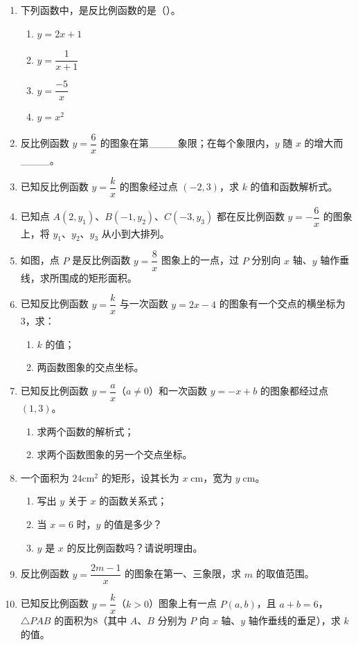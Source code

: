 \documentclass[12pt, a4paper]{ctexart}
\begin{document}
\begin{enumerate}[label=\textbf{\arabic*.}, leftmargin=2em]
  \item 下列函数中，是反比例函数的是（\quad）。
  \begin{enumerate}[label=A.]
    \item $y = 2x + 1$
    \item $y = \dfrac{1}{x + 1}$
    \item $y = \dfrac{-5}{x}$
    \item $y = x^2$
  \end{enumerate}

  \item 反比例函数 $y = \dfrac{6}{x}$ 的图象在第\_\_\_\_象限；在每个象限内，$y$ 随 $x$ 的增大而\_\_\_\_。

  \item 已知反比例函数 $y = \dfrac{k}{x}$ 的图象经过点 $(-2, 3)$，求 $k$ 的值和函数解析式。

  \item 已知点 $A(2, y_1)$、$B(-1, y_2)$、$C(-3, y_3)$ 都在反比例函数 $y = -\dfrac{6}{x}$ 的图象上，将 $y_1$、$y_2$、$y_3$ 从小到大排列。

  \item 如图，点 $P$ 是反比例函数 $y = \dfrac{8}{x}$ 图象上的一点，过 $P$ 分别向 $x$ 轴、$y$ 轴作垂线，求所围成的矩形面积。

  \item 已知反比例函数 $y = \dfrac{k}{x}$ 与一次函数 $y = 2x - 4$ 的图象有一个交点的横坐标为 $3$，求：
  \begin{enumerate}[label=(\arabic*)]
    \item $k$ 的值；
    \item 两函数图象的交点坐标。
  \end{enumerate}

  \item 已知反比例函数 $y = \dfrac{a}{x}$（$a \neq 0$）和一次函数 $y = -x + b$ 的图象都经过点 $(1, 3)$。
  \begin{enumerate}[label=(\arabic*)]
    \item 求两个函数的解析式；
    \item 求两个函数图象的另一个交点坐标。
  \end{enumerate}

  \item 一个面积为 $24\text{cm}^2$ 的矩形，设其长为 $x\;\text{cm}$，宽为 $y\;\text{cm}$。
  \begin{enumerate}[label=(\arabic*)]
    \item 写出 $y$ 关于 $x$ 的函数关系式；
    \item 当 $x = 6$ 时，$y$ 的值是多少？
    \item $y$ 是 $x$ 的反比例函数吗？请说明理由。
  \end{enumerate}

  \item 反比例函数 $y = \dfrac{2m - 1}{x}$ 的图象在第一、三象限，求 $m$ 的取值范围。

  \item 已知反比例函数 $y = \dfrac{k}{x}$（$k > 0$）图象上有一点 $P(a, b)$，且 $a + b = 6$，$\triangle PAB$ 的面积为8（其中 $A$、$B$ 分别为 $P$ 向 $x$ 轴、$y$ 轴作垂线的垂足），求 $k$ 的值。
\end{enumerate}
\end{document}
